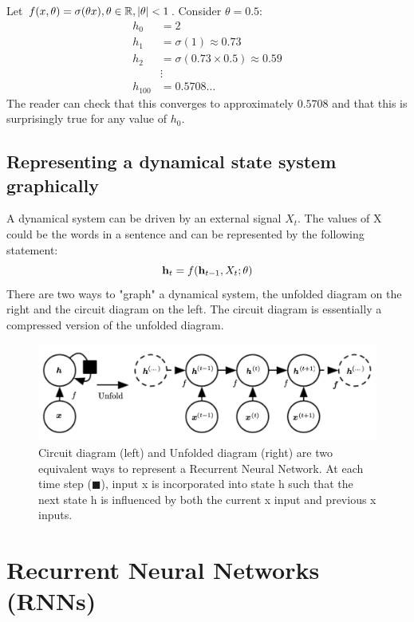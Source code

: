 \begin{example} 
Let $f(x,\theta) = \sigma(\theta x),  \theta \in \R,  |\theta| < 1$.
Consider $\theta=0.5$:
\begin{align*}
    h_0&=2\\
    h_1 &= \sigma(1) \approx 0.73\\
    h_2 &= \sigma(0.73 \times 0.5 ) \approx 0.59\\
    &\vdots\\
    h_{100} &= 0.5708 \ldots
\end{align*}
The reader can check that this converges to approximately $0.5708$ and that this is surprisingly true for any value of $h_0$.
\end{example} 
\subsection{Representing a dynamical state system graphically} A dynamical system can be driven by an external signal $X_t$. The values of X could be the words in a sentence and can be represented by the following statement:
$$\vh_t=f(\vh_{t-1}, X_t; \theta)$$
There are two ways to "graph" a dynamical system, the unfolded diagram on the right and the circuit diagram on the left. The circuit diagram is essentially a compressed version of the unfolded diagram.

\begin{figure}[H]
    \centering
    \includegraphics[scale=0.25]{images/Chapter12/circuit_and_unfolded_diagram.png}
    \caption{Circuit diagram (left) and Unfolded diagram (right) are two equivalent ways to represent a Recurrent Neural Network. At each time step ($\blacksquare$), input x is incorporated into state h such that the next state h is influenced by both the current x input and previous x inputs.}
    \label{fig:12.1}
\end{figure}
\section{Recurrent Neural Networks (RNNs)}

